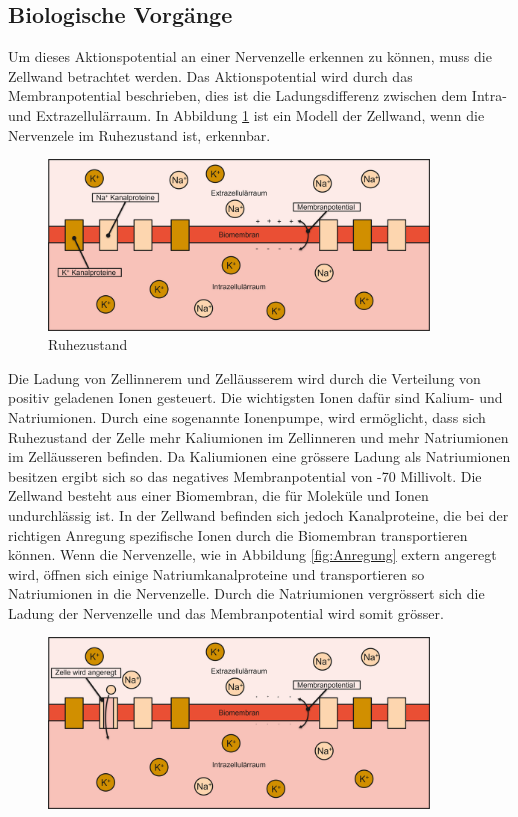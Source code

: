 \begin{refsection}
\subsection{Biologische Vorgänge}
Um dieses Aktionspotential an einer Nervenzelle erkennen zu können, muss die Zellwand betrachtet werden. 
Das Aktionspotential wird durch das Membranpotential beschrieben, dies ist die Ladungsdifferenz zwischen dem Intra- und
Extrazellulärraum.
In Abbildung \ref{fig:Ruhezustand} ist ein Modell der Zellwand, wenn die Nervenzele im Ruhezustand ist, erkennbar.
\begin{figure}[H]
    \centering
    \includegraphics[width=0.9\textwidth]{papers/nerven/Bilder/Vorgang1.png}
    \caption{Ruhezustand}
    \label{fig:Ruhezustand}
\end{figure}
\noindent
Die Ladung von Zellinnerem und Zelläusserem wird durch die Verteilung von positiv geladenen Ionen gesteuert.
Die wichtigsten Ionen dafür sind Kalium- und Natriumionen. 
Durch eine sogenannte Ionenpumpe, wird ermöglicht, dass sich Ruhezustand der Zelle mehr Kaliumionen im Zellinneren und mehr
Natriumionen im Zelläusseren befinden.
Da Kaliumionen eine grössere Ladung als Natriumionen besitzen ergibt sich so das negatives Membranpotential von -70
Millivolt.
Die Zellwand besteht aus einer Biomembran, die für Moleküle und Ionen undurchlässig ist.
In der Zellwand befinden sich jedoch Kanalproteine, die bei der richtigen Anregung spezifische Ionen durch die
Biomembran transportieren können.
\noindent
Wenn die Nervenzelle, wie in Abbildung \ref{fig:Anregung} extern angeregt wird, öffnen sich einige Natriumkanalproteine und transportieren so Natriumionen in
die Nervenzelle.
Durch die Natriumionen vergrössert sich die Ladung der Nervenzelle und das Membranpotential wird somit grösser.
\begin{figure}[H]
    \centering
    \includegraphics[width=0.9\textwidth]{papers/nerven/Bilder/Vorgang2.png}

\end{figure}
\end{refsection}
